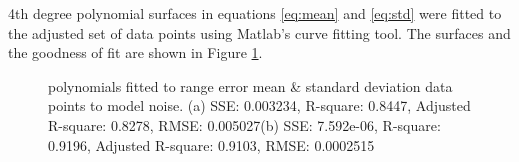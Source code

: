 		4th degree polynomial surfaces in equations \ref{eq:mean} and \ref{eq:std} were fitted to the adjusted set of data points using Matlab's curve fitting tool. The surfaces and the goodness of fit are shown in Figure \ref{fig:surface_range_error}. 
		\begin{figure}
	  		\centering
	  		\caption{polynomials fitted to range error mean \& standard deviation data points to model noise. (a) SSE: 0.003234, R-square: 0.8447, Adjusted R-square: 0.8278, RMSE: 0.005027(b) SSE: 7.592e-06, R-square: 0.9196, Adjusted R-square: 0.9103, RMSE: 0.0002515}
	  		\label{fig:surface_range_error}
		\end{figure}
		
